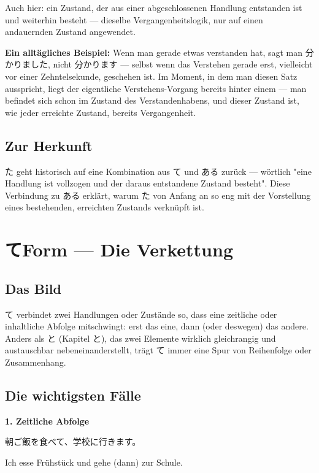 \documentclass[12pt]{book}
\begin{document}
Auch hier: ein Zustand, der aus einer abgeschlossenen Handlung entstanden ist und weiterhin besteht — dieselbe Vergangenheitslogik, nur auf einen andauernden Zustand angewendet.

\textbf{Ein alltägliches Beispiel:} Wenn man gerade etwas verstanden hat, sagt man 分かりました, nicht 分かります — selbst wenn das Verstehen gerade erst, vielleicht vor einer Zehntelsekunde, geschehen ist. Im Moment, in dem man diesen Satz ausspricht, liegt der eigentliche Verstehens-Vorgang bereits hinter einem — man befindet sich schon im Zustand des Verstandenhabens, und dieser Zustand ist, wie jeder erreichte Zustand, bereits Vergangenheit.

\section*{Zur Herkunft}

た geht historisch auf eine Kombination aus て und ある zurück — wörtlich "eine Handlung ist vollzogen und der daraus entstandene Zustand besteht". Diese Verbindung zu ある erklärt, warum た von Anfang an so eng mit der Vorstellung eines bestehenden, erreichten Zustands verknüpft ist.


\chapter{てForm — Die Verkettung}

\section*{Das Bild}

て verbindet zwei Handlungen oder Zustände so, dass eine zeitliche oder inhaltliche Abfolge mitschwingt: erst das eine, dann (oder deswegen) das andere. Anders als と (Kapitel と), das zwei Elemente wirklich gleichrangig und austauschbar nebeneinanderstellt, trägt て immer eine Spur von Reihenfolge oder Zusammenhang.

\section*{Die wichtigsten Fälle}

\textbf{1. Zeitliche Abfolge}
\par\quad 朝ご飯を食べて、学校に行きます。\\
\par\quad Ich esse Frühstück und gehe (dann) zur Schule.\\
\end{document}
